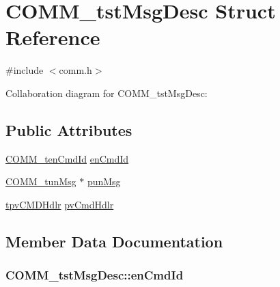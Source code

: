 \hypertarget{struct_c_o_m_m__tst_msg_desc}{}\section{C\+O\+M\+M\+\_\+tst\+Msg\+Desc Struct Reference}
\label{struct_c_o_m_m__tst_msg_desc}


{\ttfamily \#include $<$comm.\+h$>$}



Collaboration diagram for C\+O\+M\+M\+\_\+tst\+Msg\+Desc\+:
\subsection*{Public Attributes}
\begin{DoxyCompactItemize}
\item 
\hyperlink{comm_8h_a3cfaafb8d767b176a4eaeb927a615d6f}{C\+O\+M\+M\+\_\+ten\+Cmd\+Id} \hyperlink{struct_c_o_m_m__tst_msg_desc_aa392fc77cf228561555628f5633a56d0}{en\+Cmd\+Id}
\item 
\hyperlink{union_c_o_m_m__tun_msg}{C\+O\+M\+M\+\_\+tun\+Msg} $\ast$ \hyperlink{struct_c_o_m_m__tst_msg_desc_ae9bd9271a76016a5c1ad83b30a0e1886}{pun\+Msg}
\item 
\hyperlink{comm_8h_a20677734f465f51789006e41c0629a00}{tpv\+C\+M\+D\+Hdlr} \hyperlink{struct_c_o_m_m__tst_msg_desc_aa93ad2aeb6e15c4e1ba0a2c3697fbd61}{pv\+Cmd\+Hdlr}
\end{DoxyCompactItemize}


\subsection{Member Data Documentation}
\hypertarget{struct_c_o_m_m__tst_msg_desc_aa392fc77cf228561555628f5633a56d0}{}
\subsubsection[{en\+Cmd\+Id}]{ C\+O\+M\+M\+\_\+tst\+Msg\+Desc\+::en\+Cmd\+Id}\label{struct_c_o_m_m__tst_msg_desc_aa392fc77cf228561555628f5633a56d0}
\hypertarget{struct_c_o_m_m__tst_msg_desc_ae9bd9271a76016a5c1ad83b30a0e1886}{}
